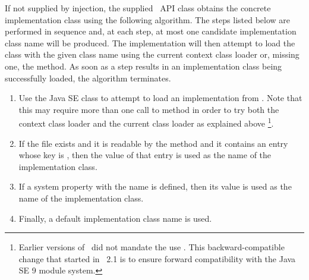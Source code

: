 If not supplied by injection, the supplied \rd\ API class obtains the concrete implementation class using the following algorithm. The steps listed below are performed in sequence and, at each step, at most one candidate implementation class name will be produced. The implementation will then attempt to load the class with the given class name using the current context class loader or, missing one, the  method. As soon as a step results in an implementation class being successfully loaded, the algorithm terminates.
\begin{enumerate}
\item Use the Java SE class  to attempt to load an implementation from . Note that this may require more than one call to method  in order to try both the context class loader and the current class loader as explained above
\footnote{Earlier versions of \jaxrs\ did not mandate the use . This backward-compatible change that started in \jaxrs\ 2.1 is to ensure forward compatibility with the Java SE 9 module system.}.
\item If the  file exists and it is readable by the  method and it contains an entry whose key is , then the value of that entry is used as the name of the implementation class. 
\item If a system property with the name  is defined, then its value is used as the name of the implementation class. 
\item Finally, a default implementation class name is used. 
\end{enumerate}
